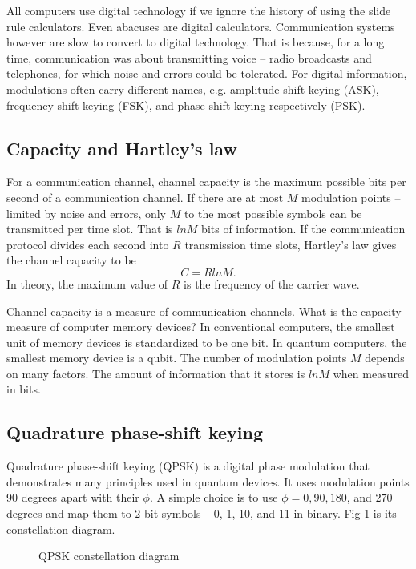 \documentclass[oneside, letter, 12pt]{book}
\begin{document}
All computers use digital technology if we ignore the history of using the slide rule calculators. Even abacuses are digital calculators. Communication systems however are slow to convert to digital technology. That is because, for a long time, communication was about transmitting voice -- radio broadcasts and telephones, for which noise and errors could be tolerated. For digital information, modulations often carry different names, e.g. amplitude-shift keying (ASK), frequency-shift keying (FSK), and phase-shift keying respectively (PSK).

\subsection{Capacity and Hartley's law}
For a communication channel, channel capacity is the maximum possible bits per second of a communication channel. If there are at most $M$ modulation points -- limited by noise and errors, only $M$ to the most possible symbols can be transmitted per time slot. That is $ln M$ bits of information. If the communication protocol divides each second into $R$ transmission time slots, Hartley's law gives the channel capacity to be
\begin{equation}
    C = R ln M.
\end{equation}
In theory, the maximum value of $R$ is the frequency of the carrier wave.

Channel capacity is a measure of communication channels. What is the capacity measure of computer memory devices? In conventional computers, the smallest unit of memory devices is standardized to be one bit. In quantum computers, the smallest memory device is a qubit. The number of modulation points $M$ depends on many factors. The amount of information that it stores is $ln M$ when measured in bits.

\subsection{Quadrature phase-shift keying}
Quadrature phase-shift keying (QPSK) is a digital phase modulation that demonstrates many principles used in quantum devices. It uses modulation points 90 degrees apart with their $\phi$. A simple choice is to use $\phi = 0, 90, 180$, and $270$ degrees and map them to 2-bit symbols -- 0, 1, 10, and 11 in binary. Fig-\ref{QPSK} is its constellation diagram.

\begin{figure}[ht]\label{QPSK}
\caption{QPSK constellation diagram}
\end{figure}
\end{document}
